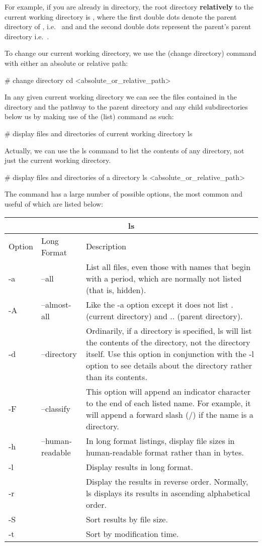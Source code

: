 \be
For example, if you are already in  directory, the root directory \textbf{relatively} to the current
working directory  is , where the first double dots denote the parent directory of
, i.e.\  and and the second double dots represent the parent's parent directory i.e.\
\code{/}.
\ee

To change our current working directory, we use the  (change directory) command with either an absolute or
relative path:
\begin{bash}
# change directory
cd <absolute_or_relative_path>
\end{bash}

In any given current working directory we can see the files contained in the directory and the pathway
to the parent directory and any child subdirectories below us by making use of the \code{ls} (list) command as such:
\begin{bash}
# display files and directories of current working directory
ls
\end{bash}

Actually, we can use the ls command to list the contents of any directory, not just the current working directory.
\begin{bash}
# display files and directories of a directory
ls <absolute_or_relative_path>
\end{bash}

The  command has a large number of possible options, the most common and useful of which are listed below:

\begin{tabular}{ |p{1cm}|p{3cm}||p{10.6cm}| }
\hline
\multicolumn{3}{|c|}{ls} \\
\hline
Option& Long Format& Description\\
\hline
-a & --all & List all files, even those with names that begin with a period, which are normally not listed (that is, hidden).\\
-A & --almost-all & Like the -a option except it does not list . (current directory) and .. (parent directory).\\
-d & --directory & Ordinarily, if a directory is specified, ls will list the contents of the directory, not the directory itself. Use this option in conjunction with the -l option to see details about the directory rather than its contents.\\
-F & --classify & This option will append an indicator character to the end of each listed name. For example, it will append a forward slash (/) if the name is a directory.\\
-h & --human-readable & In long format listings, display file sizes in human-readable format rather than in bytes.\\
-l  & & Display results in long format.\\
-r & & Display the results in reverse order. Normally, ls displays its results in ascending alphabetical order.\\
-S  & & Sort results by file size.\\
-t  & & Sort by modification time.\\
\hline
\end{tabular}

